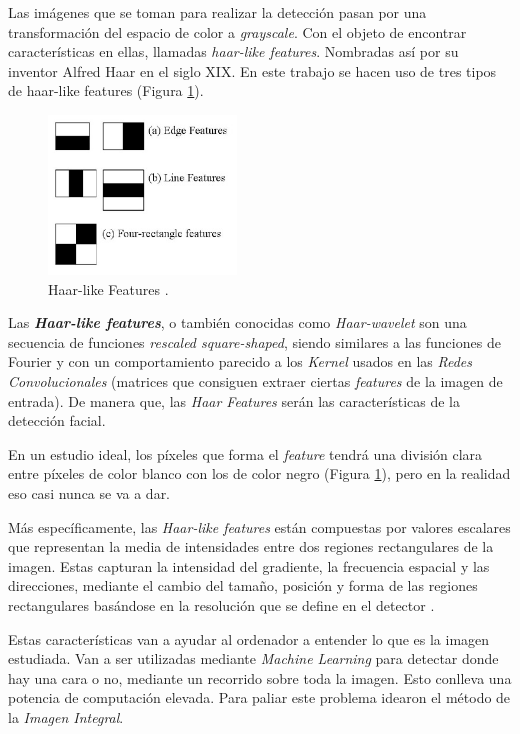 Las imágenes que se toman para realizar la detección pasan por una transformación del espacio de color a \textit{grayscale}. Con el objeto de encontrar características en ellas, llamadas \textit{haar-like features}. Nombradas así por su inventor Alfred Haar en el siglo XIX. En este trabajo se hacen uso de tres tipos de haar-like features (Figura \ref{fig:haarLike}).

\begin{figure}[htp]
	\centering
	\includegraphics[width=5cm]{imagenes/haar-like.jpeg}
	\caption{Haar-like Features \cite{haar-like}.}
	\label{fig:haarLike}
\end{figure}

Las \textbf{\textit{Haar-like features}}, o también conocidas como \textit{Haar-wavelet} son una secuencia de funciones \textit{rescaled square-shaped}, siendo similares a las funciones de Fourier y con un comportamiento parecido a los \textit{Kernel} usados en las \textit{Redes Convolucionales} (matrices que consiguen extraer ciertas \textit{features} de la imagen de entrada). De manera que, las \textit{Haar Features} serán las características de la detección facial.

En un estudio ideal, los píxeles que forma el \textit{feature} tendrá una división clara entre píxeles de color blanco con los de color negro (Figura \ref{fig:haarLike}), pero en la realidad eso casi nunca se va a dar.

Más específicamente, las \textit{Haar-like features} están compuestas por valores escalares que representan la media de intensidades entre dos regiones rectangulares de la imagen. Estas capturan la intensidad del gradiente, la frecuencia espacial y las direcciones, mediante el cambio del tamaño, posición y forma de las regiones rectangulares basándose en la resolución que se define en el detector \cite{haar-like}. 

Estas características van a ayudar al ordenador a entender lo que es la imagen estudiada. Van a ser utilizadas mediante \textit{Machine Learning} para detectar donde hay una cara o no, mediante un recorrido sobre toda la imagen. Esto conlleva una potencia de computación elevada. Para paliar este problema idearon el método de la \textit{Imagen Integral}.

